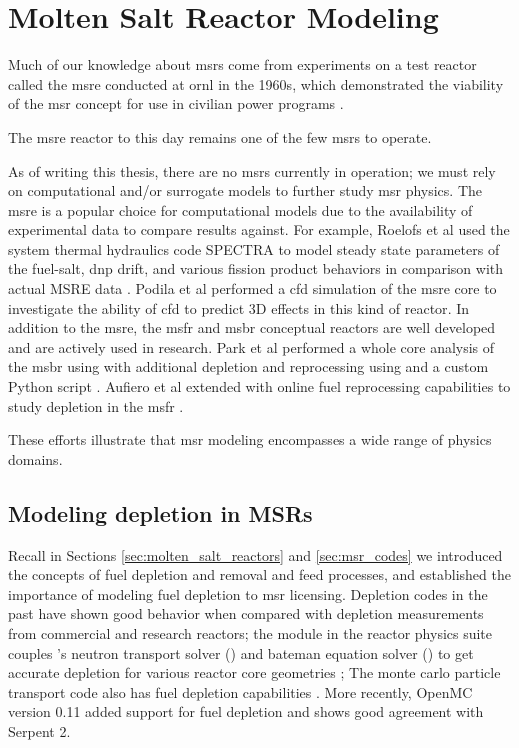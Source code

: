 \chapter{Molten Salt Reactor Modeling}%
Much of our knowledge about \Gls{msr}s come from experiments on a test reactor
called the \Gls{msre} conducted at \Gls{ornl} in the 1960s, which demonstrated
the viability of the \Gls{msr} concept for use in civilian power programs
\cite{haubenreich_experience_1970} \cite{rosenthal_molten-salt_1970}.

The \Gls{msre} reactor to this day remains one of the few \Gls{msr}s to operate.

As of writing this thesis, there are no \Gls{msr}s currently in operation; we
must rely on computational and/or surrogate models to further study \Gls{msr}
physics. The \Gls{msre} is a popular choice for computational models due to the
availability of experimental data to compare results against. For example,
Roelofs et al used the system thermal hydraulics code SPECTRA to model steady
state parameters of the fuel-salt, \Gls{dnp} drift, and various fission product
behaviors in comparison with actual MSRE data \cite{roelofs_molten_2021}.
Podila et al performed a \Gls{cfd} simulation of the \Gls{msre} core to
investigate the ability of \Gls{cfd} to predict 3D effects in this kind of
reactor\cite{podila_cfd_2019}. 
In addition to the \Gls{msre}, the \Gls{msfr}\cite{merle-lucotte_launching_2011}
and \Gls{msbr}\cite{robertson_conceptual_1971} conceptual reactors are well
developed and are actively used in research. Park et al performed a whole core
analysis of the \Gls{msbr} using \MCNPSIX with additional depletion and
reprocessing using \CINDERNINETY and a custom Python script \cite{park_whole_2015}.
Aufiero et al extended \SerpentTWO with online fuel reprocessing capabilities to
study depletion in the \Gls{msfr} \cite{aufiero_extended_2013}.

These efforts illustrate that \Gls{msr} modeling encompasses a wide range of
physics domains.

\section{Modeling depletion in MSRs} Recall in Sections
\ref{sec:molten_salt_reactors} and \ref{sec:msr_codes} we introduced the
concepts of fuel depletion and removal and feed processes, and established the
importance of modeling fuel depletion to \Gls{msr} licensing. Depletion codes in
the past have shown good behavior when compared with depletion measurements from
commercial and research reactors; the \TRITON module in the \SCALE reactor physics
suite couples \SCALE's neutron transport solver (\Shift) and bateman equation
solver (\ORIGEN) to get accurate depletion for various reactor core geometries
\cite{dehart_reactor_2011}; The \SerpentTWO monte carlo particle transport code
also has fuel depletion capabilities \cite{leppanen_burnup_2009}. More recently,
OpenMC version 0.11 added support for fuel depletion and shows good agreement
with Serpent 2\cite{romano_depletion_2021}. 

